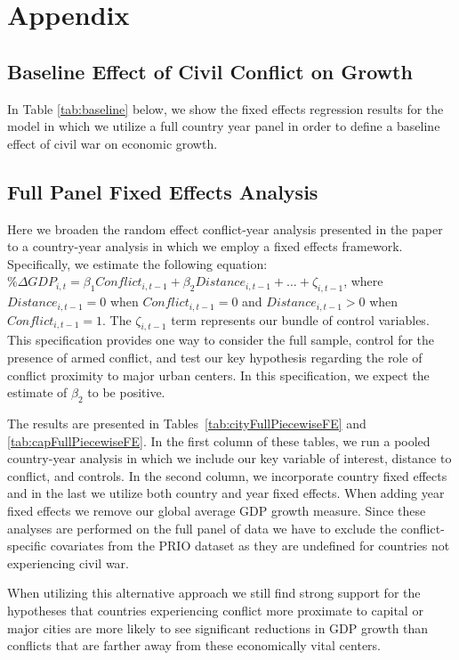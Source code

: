 
\newpage
\section{Appendix}
\label{appendix}

\subsection{Baseline Effect of Civil Conflict on Growth}

In Table \ref{tab:baseline} below, we show the fixed effects regression results for the model in which we utilize a full country year panel in order to define a baseline effect of civil war on economic growth. 


\FloatBarrier
\newpage

\subsection{Full Panel Fixed Effects Analysis}

Here we broaden the random effect conflict-year analysis presented in the paper to a country-year analysis in which we employ a fixed effects framework. Specifically, we estimate the following equation: $\% \Delta GDP_{i,t} = \beta_{1}Conflict_{i,t-1} + \beta_{2}Distance_{i,t-1}+\ldots+\zeta_{i,t-1}$, where $Distance_{i,t-1}=0$ when $Conflict_{i,t-1}=0$ and $Distance_{i,t-1}>0$ when $Conflict_{i,t-1}=1$. The $\zeta_{i,t-1}$ term represents our bundle of control variables. This specification provides one way to consider the full sample, control for the presence of armed conflict, and test our key hypothesis regarding the role of conflict proximity to major urban centers. In this specification, we expect the estimate of $\beta_{2}$ to be positive.

The results are presented in Tables~\ref{tab:cityFullPiecewiseFE} and \ref{tab:capFullPiecewiseFE}. In the first column of these tables, we run a pooled country-year analysis in which we include our key variable of interest, distance to conflict, and controls. In the second column, we incorporate country fixed effects and in the last we utilize both country and year fixed effects. When adding year fixed effects we remove our global average GDP growth measure. Since these analyses are performed on the full panel of data we have to exclude the conflict-specific covariates from the PRIO dataset as they are undefined for countries not experiencing civil war. 

When utilizing this alternative approach we still find strong support for the hypotheses that countries experiencing conflict more proximate to capital or major cities are more likely to see significant reductions in GDP growth than conflicts that are farther away from these economically vital centers.


\FloatBarrier


\FloatBarrier


